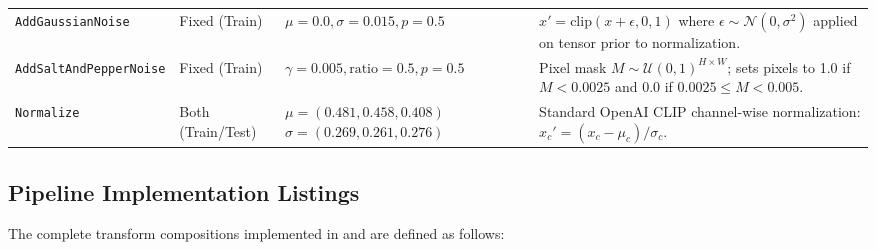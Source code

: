 \documentclass[letterpaper,11pt,leqno]{article}
\begin{document}
\begin{table}[H]
\begin{tabularx}{\textwidth}{l >{\raggedright\arraybackslash}p{2.1cm} >{\raggedright\arraybackslash}p{3.0cm} >{\raggedright\arraybackslash}X}
\addlinespace
\texttt{AddGaussianNoise} & Fixed (Train) & $\mu=0.0, \sigma=0.015, p=0.5$ & $x' = \mathrm{clip}(x + \epsilon, 0, 1)$ where $\epsilon \sim \mathcal{N}(0, \sigma^2)$ applied on tensor prior to normalization. \\
\addlinespace
\texttt{AddSaltAndPepperNoise} & Fixed (Train) & $\gamma=0.005, \text{ratio}=0.5, p=0.5$ & Pixel mask $M \sim \mathcal{U}(0, 1)^{H \times W}$; sets pixels to 1.0 if $M < 0.0025$ and 0.0 if $0.0025 \le M < 0.005$. \\
\addlinespace
\texttt{Normalize} & Both (Train/Test) & $\mu=(0.481, 0.458, 0.408)$ \newline $\sigma=(0.269, 0.261, 0.276)$ & Standard OpenAI CLIP channel-wise normalization: $x_c' = (x_c - \mu_c) / \sigma_c$. \\
\bottomrule
\end{tabularx}
\end{table}

\newpage

\subsection{Pipeline Implementation Listings}

The complete transform compositions implemented in  and  are defined as follows:
\end{document}
